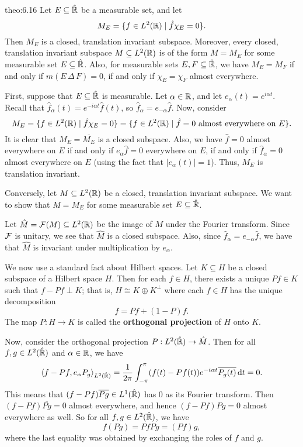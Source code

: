 \begin{theo}{theo:6.16}
    Let $E \subseteq \hat {\mathbb{R}}$ be a measurable set, and let 
    \[ M_E = \{f \in L^2(\mathbb{R}) \mid \hat f \chi_E = 0\}. \] 
    Then $M_E$ is a closed, translation invariant subspace. Moreover, 
    every closed, translation invariant subspace $M \subseteq L^2(\mathbb{R})$ 
    is of the form $M = M_E$ for some measurable set $E \subseteq \hat {\mathbb{R}}$. 
    Also, for measurable sets $E, F \subseteq \hat {\mathbb{R}}$, we have 
    $M_E = M_F$ if and only if $m(E\,\Delta\,F) = 0$, if and only if 
    $\chi_E = \chi_F$ almost everywhere. 
\end{theo}
\begin{pf}
    First, suppose that $E \subseteq \hat {\mathbb{R}}$ is measurable. Let 
    $\alpha \in \mathbb{R}$, and let $e_\alpha(t) = e^{i\alpha t}$. Recall that 
    $\hat f_\alpha(t) = e^{-i\alpha t} \hat f(t)$, so $\hat f_\alpha 
    = e_{-\alpha} \hat f$. Now, consider 
    \[ M_E = \{f \in L^2(\mathbb{R}) \mid \hat f \chi_E = 0\}
    = \{f \in L^2(\mathbb{R}) \mid \hat f = 0 \text{ almost everywhere on $E$}\}. \] 
    It is clear that $M_E = \overline{M_E}$ is a closed subspace. Also, 
    we have $\hat f = 0$ almost everywhere on $E$ if and only if 
    $e_\alpha \hat f = 0$ everywhere on $E$, if and only if 
    $\hat f_\alpha = 0$ almost everywhere on $E$ (using the fact that 
    $|e_\alpha(t)| = 1$). Thus, $M_E$ is translation invariant. 

    Conversely, let $M \subseteq L^2(\mathbb{R})$ be a closed, translation invariant
    subspace. We want to show that $M = M_E$ for some measurable set 
    $E \subseteq \hat {\mathbb{R}}$.  

    Let $\hat M = {\cal F}(M) \subseteq L^2(\mathbb{R})$ be the image of $M$ under the 
    Fourier transform. Since ${\cal F}$ is unitary, we see that $\hat M$ 
    is a closed subspace. Also, since $\hat f_\alpha = e_{-\alpha} \hat f$, 
    we have that $\hat M$ is invariant under multiplication by $e_\alpha$. 
    
    We now use a standard fact about Hilbert spaces. Let $K \subseteq H$ 
    be a closed subspace of a Hilbert space $H$. Then for each 
    $f \in H$, there exists a unique $Pf \in K$ such that $f - Pf 
    \perp K$; that is, $H \cong K \oplus K^\perp$ where each $f \in H$ 
    has the unique decomposition 
    \[ f = Pf + (1 - P)f. \] 
    The map $P : H \to K$ is called the {\bf orthogonal projection} of $H$ 
    onto $K$. 

    Now, consider the orthogonal projection $P : L^2(\hat{\mathbb{R}}) \to \hat M$.
    Then for all $f, g \in L^2(\hat {\mathbb{R}})$ and $\alpha \in \mathbb{R}$, we have 
    \[ \langle f - Pf, e_\alpha P_g \rangle_{L^2(\hat{\mathbb{R}})} = 
    \frac{1}{2\pi} \int_{-\pi}^\pi (f(t) - Pf(t)) e^{-i\alpha t} 
    \overline{P_g(t)}\,\mathrm{d} t = 0. \] 
    This means that $(f - Pf) \overline{Pg} \in L^1(\hat {\mathbb{R}})$ has $0$ 
    as its Fourier transform. Then $(f - Pf) \overline{Pg} = 0$ almost 
    everywhere, and hence $(f - Pf) Pg = 0$ almost everywhere as well. 
    So for all $f, g \in L^2(\hat {\mathbb{R}})$, we have 
    \[ f(Pg) = PfPg = (Pf)g, \] 
    where the last equality was obtained by exchanging the roles of $f$ and $g$. 


\end{pf}
